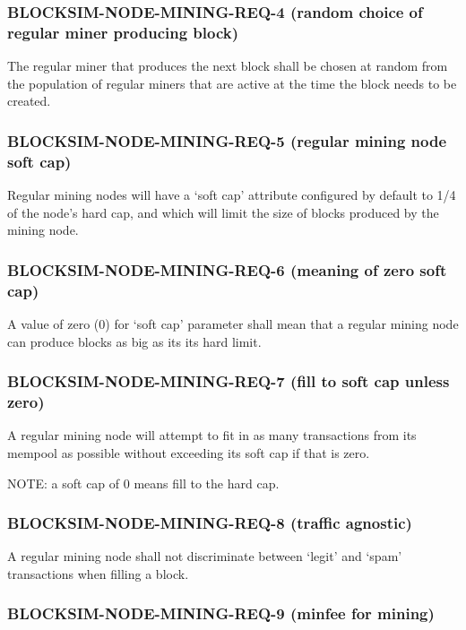 \documentclass{scrreprt}
\begin{document}
\subsubsection{BLOCKSIM-NODE-MINING-REQ-4 (random choice of regular miner producing block)}

The regular miner that produces the next block shall be chosen at random
from the population of regular miners that are active at the time the block
needs to be created.


\subsubsection{BLOCKSIM-NODE-MINING-REQ-5 (regular mining node soft cap)}

Regular mining nodes will have a `soft cap' attribute configured by default to
1/4 of the node's hard cap, and which will limit the size of blocks produced
by the mining node.


\subsubsection{BLOCKSIM-NODE-MINING-REQ-6 (meaning of zero soft cap)}

A value of zero (0) for `soft cap' parameter shall mean that a regular mining
node can produce blocks as big as its its hard limit.


\subsubsection{BLOCKSIM-NODE-MINING-REQ-7 (fill to soft cap unless zero)}

A regular mining node will attempt to fit in as many transactions from its mempool
as possible without exceeding its soft cap if that is zero.

NOTE: a soft cap of 0 means fill to the hard cap.


\subsubsection{BLOCKSIM-NODE-MINING-REQ-8 (traffic agnostic)}

A regular mining node shall not discriminate between `legit' and `spam' transactions
when filling a block.

\subsubsection{BLOCKSIM-NODE-MINING-REQ-9 (minfee for mining)}
\end{document}
